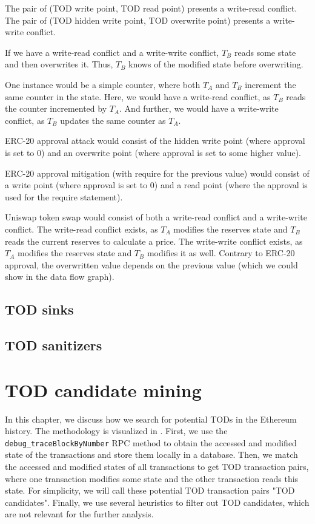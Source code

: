 \documentclass[draft,final]{vutinfth} %
\begin{document}
    The pair of (TOD write point, TOD read point) presents a write-read conflict. The pair of (TOD hidden write point, TOD overwrite point) presents a write-write conflict.

    If we have a write-read conflict and a write-write conflict, $T_B$ reads some state and then overwrites it. Thus, $T_B$ knows of the modified state before overwriting.

    One instance would be a simple counter, where both $T_A$ and $T_B$ increment the same counter in the state. Here, we would have a write-read conflict, as $T_B$ reads the counter incremented by $T_A$. And further, we would have a write-write conflict, as $T_B$ updates the same counter as $T_A$.

    ERC-20 approval attack would consist of the hidden write point (where approval is set to 0) and an overwrite point (where approval is set to some higher value).

    ERC-20 approval mitigation (with require for the previous value) would consist of a write point (where approval is set to 0) and a read point (where the approval is used for the require statement).

    Uniswap token swap would consist of both a write-read conflict and a write-write conflict. The write-read conflict exists, as $T_A$ modifies the reserves state and $T_B$ reads the current reserves to calculate a price. The write-write conflict exists, as $T_A$ modifies the reserves state and $T_B$ modifies it as well. Contrary to ERC-20 approval, the overwritten value depends on the previous value (which we could show in the data flow graph).

    \section{TOD sinks}

    \section{TOD sanitizers}

\fi
\chapter{TOD candidate mining}

In this chapter, we discuss how we search for potential TODs in the Ethereum history. The methodology is visualized in . First, we use the \verb|debug_traceBlockByNumber| RPC method to obtain the accessed and modified state of the transactions and store them locally in a database. Then, we match the accessed and modified states of all transactions to get TOD transaction pairs, where one transaction modifies some state and the other transaction reads this state. For simplicity, we will call these potential TOD transaction pairs "TOD candidates". Finally, we use several heuristics to filter out TOD candidates, which are not relevant for the further analysis.
\end{document}
